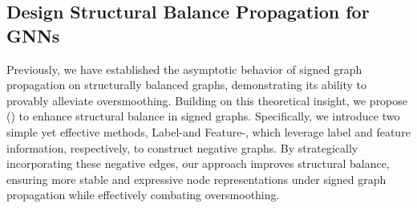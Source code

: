 % 

\subsection{Design Structural Balance Propagation for GNNs}
\label{subsec: sb methods}
Previously, we have established the asymptotic behavior of signed graph propagation on structurally balanced graphs, demonstrating its ability to provably alleviate oversmoothing. 
Building on this theoretical insight, we propose \oursfull (\ours) to enhance structural balance in signed graphs. Specifically, we introduce two simple yet effective methods, Label-\ours and Feature-\ours, which leverage label and feature information, respectively, to construct negative graphs. By strategically incorporating these negative edges, our approach improves structural balance, ensuring more stable and expressive node representations under signed graph propagation while effectively combating oversmoothing.

